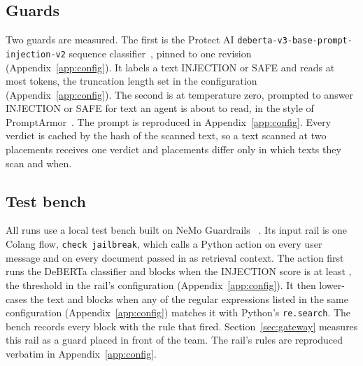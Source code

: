 \documentclass[conference]{IEEEtran}
\begin{document}
\subsection{Guards}

Two guards are measured. The first is the Protect AI
\texttt{deberta-v3-base-prompt-injection-v2} sequence
classifier~\cite{protectai2024deberta,he2021debertav3}, pinned to one
revision (Appendix~\ref{app:config}). It labels a text INJECTION or SAFE and
reads at most \DebertaMaxLen{} tokens, the truncation length set in the
configuration (Appendix~\ref{app:config}). The second is \texttt{\LlmGuardModel{}}
at temperature zero, prompted to answer INJECTION or SAFE for text an agent
is about to read, in the style of PromptArmor~\cite{shi2025promptarmor}. The
prompt is reproduced in Appendix~\ref{app:config}. Every verdict is cached by
the hash of the scanned text, so a text scanned at two placements receives
one verdict and placements differ only in which texts they scan and when.

\subsection{Test bench}

All runs use a local test bench built on NeMo Guardrails
\NemoVersion{}~\cite{rebedea2023nemo}. Its input rail is one Colang flow,
\texttt{check jailbreak}, which calls a Python action on every user message
and on every document passed in as retrieval context. The action first runs
the DeBERTa classifier and blocks when the INJECTION score is at least
\RailThreshold{}, the threshold in the rail's configuration
(Appendix~\ref{app:config}). It then lower-cases the text and blocks when any
of the \NRailPatterns{} regular expressions listed in the same configuration
(Appendix~\ref{app:config}) matches it with Python's \texttt{re.search}. The bench records every block with the rule that fired.
Section~\ref{sec:gateway} measures this rail as a guard placed in front of the
team. The rail's rules are reproduced verbatim in Appendix~\ref{app:config}.
\end{document}
